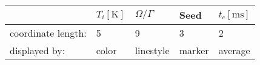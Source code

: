 \begin{tabular}{lllll}
\hline
                    & $T_i \mathrm{[K]}$   & $\Omega/\Gamma$   & Seed   & $t_c \mathrm{[ms]}$   \\
\hline
 coordinate length: & 5                    & 9                 & 3      & 2                     \\
 displayed by:      & color                & linestyle         & marker & average               \\
\hline
\end{tabular}
